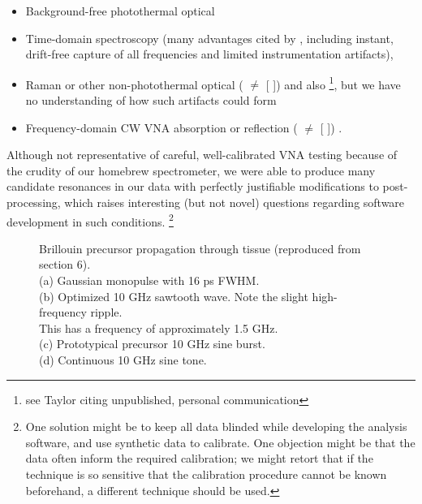 \documentclass[paper.tex]{subfiles}
\begin{document}
\begin{multicols}{1}
\begin{itemize}
\item Background-free photothermal optical \cite{Microwave1993a}\cite{Broadband1988}
\item Time-domain spectroscopy (many advantages cited by \cite{Time2003}, including instant, drift-free capture of all frequencies and limited instrumentation artifacts), \cite{Dielectric2004}\cite{Microwave1994}
\item Raman or other non-photothermal optical (\cite{optical1983} $\neq$ [\cite{Resonances1987} \cite{Dielectric1989}]) and also \footnote{see Taylor \cite{mechanisms1981} citing unpublished, personal communication}, but we have no understanding of how such artifacts could form
\item Frequency-domain CW VNA absorption or reflection (\cite{Microwave1982} $\neq$ [\cite{Resonances1987} \cite{Dielectric1989}]) \cite{Substitution1982} \cite{Millimeter1980}.
\end{itemize}

Although not representative of careful, well-calibrated VNA testing because of the crudity of our homebrew spectrometer, we were able to produce many candidate resonances in our data with perfectly justifiable modifications to post-processing, which raises interesting (but not novel\cite{Reanalysis2020}\cite{statistical2020}) questions regarding software development in such conditions. \footnote{One solution might be to keep all data blinded while developing the analysis software, and use synthetic data to calibrate. One objection might be that the data often inform the required calibration; we might retort that if the technique is so sensitive that the calibration procedure cannot be known beforehand, a different technique should be used.}

\end{multicols}
\begin{figure}[H]
	
	\caption{Brillouin precursor propagation through tissue (reproduced from section 6).\\
		(a) Gaussian monopulse with 16 ps FWHM.\\
		(b) Optimized 10 GHz sawtooth wave. Note the slight high-frequency ripple.\\ This has a frequency of approximately 1.5 GHz.\\
		(c) Prototypical precursor 10 GHz sine burst.\\
		(d) Continuous 10 GHz sine tone.}
	
\end{figure}
\end{document}
